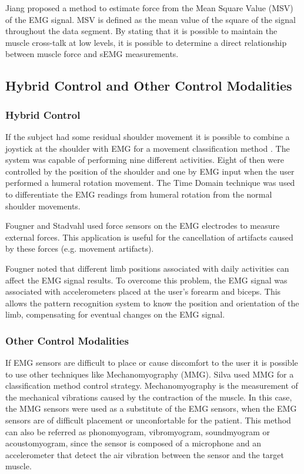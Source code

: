    Jiang \cite{Jiang4663628} proposed a method to estimate force from the Mean Square Value (MSV) of the EMG signal. MSV is defined as the mean value of the square of the signal throughout the data segment. By stating that it is possible to maintain the muscle cross-talk at low levels, it is possible to determine a direct relationship between muscle force and sEMG measurements.
   
   \subsection{Hybrid Control and Other Control Modalities}
   
   \subsubsection{Hybrid Control}
     
   If the subject had some residual shoulder movement it is possible to combine a joystick at the shoulder with EMG for a movement classification method \cite{Losier4353750}. The system was capable of performing nine different activities. Eight of then were controlled by the position of the shoulder and one by EMG input when the user performed a humeral rotation movement. The Time Domain technique was used to differentiate the EMG readings from humeral rotation from the normal shoulder movements.
   
   Fougner and Stadvahl \cite{Fougner2008}\cite{Fougner2011} used force sensors on the EMG electrodes to measure external forces. This application is useful for the cancellation of artifacts caused by these forces (e.g. movement artifacts). 
   
   Fougner \cite{Fougner5985538} noted that different limb positions associated with daily activities can affect the EMG signal results. To overcome this problem, the EMG signal was associated with accelerometers placed at the user's forearm and biceps. This allows the pattern recognition system to know the position and orientation of the limb, compensating for eventual changes on the EMG signal.
   
   \subsubsection{Other Control Modalities}
   
   If EMG sensors are difficult to place or cause discomfort to the user it is possible to use other techniques like Mechanomyography (MMG). Silva \cite{Silva1280527} used MMG for a classification method control strategy. Mechanomyography is the measurement of the mechanical vibrations caused by the contraction of the muscle. In this case, the MMG sensors were used as a substitute of the EMG sensors, when the EMG sensors are of difficult placement or unconfortable for the patient. This method can also be referred as phonomyogram, vibromyogram, soundmyogram or acoustomyogram, since the sensor is composed of a microphone and an accelerometer that detect the air vibration between the sensor and the target muscle. 
   
